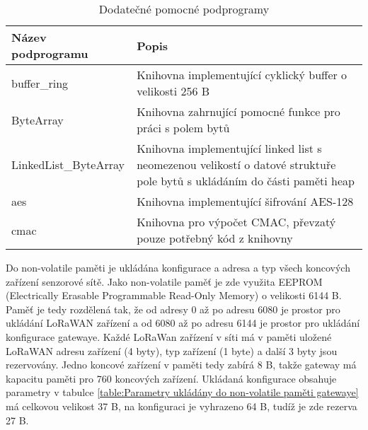 \newpage

\begin{longtable} { |l|p{8cm}| }
    \caption{Dodatečné pomocné podprogramy} 
    \label{table:sw_div} \\
    \hline

     Název podprogramu  & Popis           \\ \hline \hline

    buffer\_ring            & Knihovna implementující cyklický buffer o velikosti 256 B   \\ \hline
    ByteArray               & Knihovna zahrnující pomocné funkce pro práci s polem bytů       \\ \hline
    LinkedList\_ByteArray   & Knihovna implementující linked list s neomezenou velikostí o datové struktuře pole bytů s ukládáním do části paměti heap    \\ \hline
    aes                     & Knihovna implementující šifrování AES-128 \cite{lib_tiny-AES128-C}                \\ \hline
    cmac                    & Knihovna pro výpočet CMAC, převzatý pouze potřebný kód z knihovny \cite{lib_openpana}       \\ \hline

\end{longtable}

Do non-volatile paměti je ukládána konfigurace a adresa a typ všech koncových zařízení senzorové sítě.
Jako non-volatile paměť je zde využita EEPROM (Electrically Erasable Programmable Read-Only Memory) o velikosti 6144 B. 
Paměť je tedy rozdělená tak, že od adresy 0 až po adresu 6080 je prostor pro ukládání LoRaWAN zařízení a od 6080 až po adresu 6144 je prostor pro ukládání konfigurace gatewaye.
Každé LoRaWan zařízení v síti má v paměti uložené LoRaWAN adresu zařízení (4 byty), typ zařízení (1 byte) a další 3 byty jsou rezervovány. 
Jedno koncové zařízení v paměti tedy zabírá  8 B, takže gateway má kapacitu paměti pro 760 koncových zařízení.
Ukládaná konfigurace obsahuje parametry v tabulce \ref{table:Parametry ukládány do non-volatile paměti gatewaye} má celkovou velikost 37 B, na konfiguraci je vyhrazeno 64 B, tudíž je zde rezerva 27 B.

